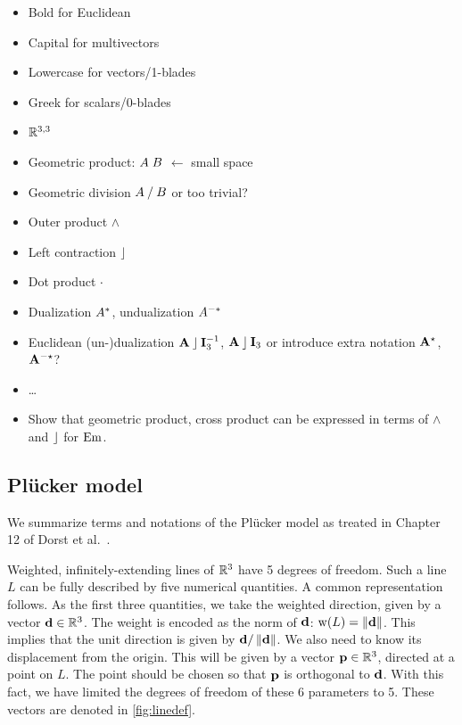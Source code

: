 \begin{itemize}
  \item Bold for Euclidean
  \item Capital for multivectors
  \item Lowercase for vectors/1-blades
  \item Greek for scalars/0-blades
  \item $\mathbb{R}^{3,3}$
  \item Geometric product: $A \; B$ $\leftarrow$ small space
  \item Geometric division $A \mathbin{/} B$ or too trivial?
  \item Outer product $\wedge$
  \item Left contraction $\mathbin{\rfloor}$
  \item Dot product $\mathbin{\cdot}$
  \item Dualization $A^\ast$, undualization $A^{-\ast}$
  \item Euclidean (un-)dualization $\mathbf{A} \mathbin{\rfloor} \mathbf{I}_3^{-1}$, $\mathbf{A} \mathbin{\rfloor} \mathbf{I}_3$ or introduce extra notation $\mathbf{A}^{\star}$, $\mathbf{A}^{-\star}$?
  \item \ldots
  \item Show that geometric product, cross product can be expressed in terms of $\wedge$ and $\mathbin{\rfloor}$ for $\operatorname{Em}$.
\end{itemize}

\subsection{Pl\"ucker model}
\label{sec:hongbo}
\label{sec:plucker}
We summarize terms and notations of the Pl\"ucker model as treated in Chapter 12 of Dorst et al.~\cite{TheBook}.

Weighted, infinitely-extending lines of $\mathbb{R}^3$ have 5 degrees of freedom.  Such a line $L$ can be fully described by five numerical quantities.  A common representation follows.  As the first three quantities, we take the weighted direction, given by a vector $\mathbf{d} \in \mathbb{R}^3$.  The weight is encoded as the norm of $\mathbf{d}$: $\operatorname{w}(L) = \left\|\mathbf{d}\right\|$.  This implies that the unit direction is given by $\mathbf{d} / \left\|\mathbf{d}\right\|$.  We also need to know its displacement from the origin.  This will be given by a vector $\mathbf{p} \in \mathbb{R}^3$, directed at a point on $L$.  The point should be chosen so that $\mathbf{p}$ is orthogonal to $\mathbf{d}$.  With this fact, we have limited the degrees of freedom of these 6 parameters to 5.  These vectors are denoted in \autoref{fig:linedef}.

